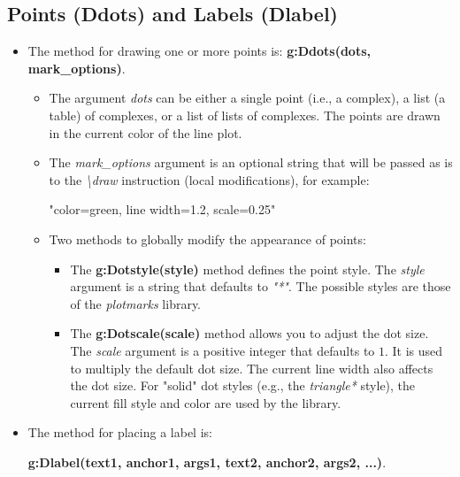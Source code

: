 \subsection{Points (Ddots) and Labels (Dlabel)}

\begin{itemize}
    \item The method for drawing one or more points is: \textbf{g:Ddots(dots, mark\_options)}.

\begin{itemize}
    \item The argument \emph{dots} can be either a single point (i.e., a complex), a list (a table) of complexes, or a list of lists of complexes. The points are drawn in the current color of the line plot.     \item The \emph{mark\_options} argument is an optional string that will be passed as is to the \emph{\textbackslash draw} instruction (local modifications), for example:
\begin{TeXcode}
"color=green, line width=1.2, scale=0.25"
\end{TeXcode}

    \item Two methods to globally modify the appearance of points:
\begin{itemize}
    \item The \textbf{g:Dotstyle(style)} method defines the point style. The \emph{style} argument is a string that defaults to \emph{"*"}. The possible styles are those of the \emph{plotmarks} library.     \item The \textbf{g:Dotscale(scale)} method allows you to adjust the dot size. The \emph{scale} argument is a positive integer that defaults to $1$. It is used to multiply the default dot size. The current line width also affects the dot size. For "solid" dot styles (e.g., the \emph{triangle*} style), the current fill style and color are used by the library.
\end{itemize}
\end{itemize}

    \item The method for placing a label is:

\hfil\textbf{g:Dlabel(text1, anchor1, args1, text2, anchor2, args2, ...)}.\hfil


\end{itemize}
